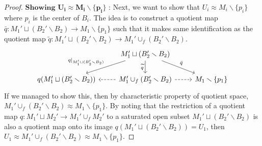 \documentclass[a4paper]{article}
\theoremstyle{remark}
\begin{document}
\begin{proof}
	$\textbf{Showing } \mathbf{U_i \approx M_i \smallsetminus \{p_i\}}$ :  Next, we want to show that $U_i \approx M_i \smallsetminus \{p_i\}$ where $p_i$ is the center of $B_i$. The idea is to construct a quotient map $\bar{q} : M_1' \sqcup (B_2' \smallsetminus B_2) \to M_1 \smallsetminus \{p_1\}$ such that it makes same identification as the quotient map $ \widetilde{q}:  M_1' \sqcup (B_2' \smallsetminus B_2) \to  M_1' \cup_f (B_2' \smallsetminus B_2)$. 
	\[
	\begin{tikzcd}
	& M_1' \sqcup (B_2' \smallsetminus B_2) \arrow[d,"\widetilde{q}",swap] \arrow[dr,"\bar{q}"] \arrow[dl,"q|_{M_1' \sqcup (B_2' \smallsetminus B_2)}",swap] & \\
	q(M_1' \sqcup (B_2' \smallsetminus B_2))&M_1' \cup_f (B_2' \smallsetminus B_2) \arrow[r,dashrightarrow] \arrow[l,dashrightarrow] & M_1 \smallsetminus \{p_1\}
	\end{tikzcd}
	\]
	If we managed to show this, then by characteristic property of quotient space, $M_1' \cup_f (B_2' \smallsetminus B_2) \approx  M_1 \smallsetminus \{p_1\}$. By noting that the restriction of a quotient map $q : M_1' \sqcup M_2' \to M_1' \cup_f M_2'$ to a saturated open subset $M_1' \sqcup (B_2' \smallsetminus B_2)$ is also a quotient map onto its image $q(M_1' \sqcup (B_2' \smallsetminus B_2)) = U_1$, then $U_1 \approx M_1' \cup_f (B_2' \smallsetminus B_2) \approx M_1 \smallsetminus \{p_1\}$.
	

\end{proof}
\end{document}
